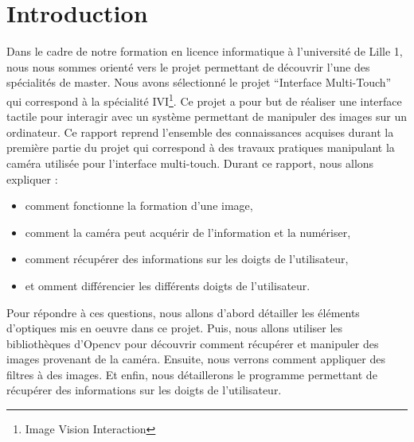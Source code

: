 \section*{Introduction}

Dans le cadre de notre formation en licence informatique à l'université de Lille 1, nous nous sommes orienté vers le projet permettant
de découvrir l'une des spécialités de master. Nous avons sélectionné le projet ``Interface Multi-Touch'' qui correspond à
la spécialité IVI\footnote{Image Vision Interaction}. Ce projet a pour but de réaliser une interface tactile pour interagir avec un système permettant de
manipuler des images sur un ordinateur. Ce rapport reprend l'ensemble des connaissances acquises durant la première partie 
du projet qui correspond à des travaux pratiques manipulant la caméra utilisée pour l'interface multi-touch. Durant ce rapport, 
nous allons expliquer : \\
\begin{itemize}
 \item comment fonctionne la formation d'une image,
 \item comment la caméra peut acquérir de l'information et la numériser,
 \item comment récupérer des informations sur les doigts de l'utilisateur,
 \item et omment différencier les différents doigts de l'utilisateur.\\
\end{itemize}

Pour répondre à ces questions, nous allons d'abord détailler les éléments d'optiques mis en oeuvre dans ce projet. Puis, nous allons
utiliser les bibliothèques d'Opencv pour découvrir comment récupérer et manipuler des images provenant de la caméra. Ensuite, nous verrons
comment appliquer des filtres à des images. Et enfin, nous détaillerons le programme permettant de récupérer des informations sur 
les doigts de l'utilisateur.
